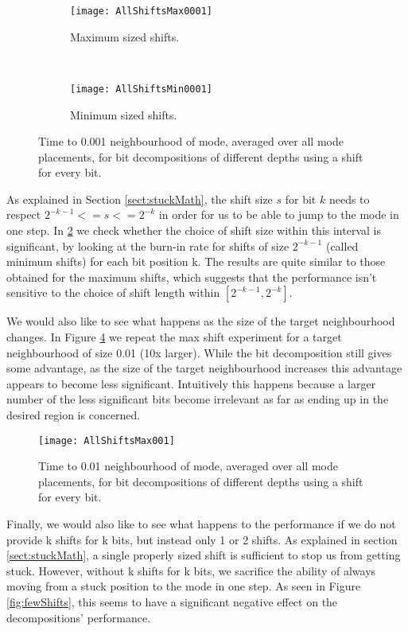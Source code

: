 \begin{figure}[h]
    \centering
    \begin{subfigure}[t]{0.48\textwidth}
      \texttt{[image: AllShiftsMax0001]}
      \caption{Maximum sized shifts.}
      \label{fig:allMaxShifts}
    \end{subfigure}
    ~
    \begin{subfigure}[t]{0.48\textwidth}
      \texttt{[image: AllShiftsMin0001]}
      \caption{Minimum sized shifts.}
      \label{fig:allMinShifts}
    \end{subfigure}
    \caption{Time to 0.001 neighbourhood of mode, averaged over all mode placements, for bit decompositions of different depths using a shift for every bit.}
    \label{fig:allShifts}
\end{figure}


As explained in Section \ref{sect:stuckMath}, the shift size $s$ for bit $k$ needs to respect $2^{-k-1} <= s <= 2^{-k}$ in order for us to be able to jump to the mode in one step. In \ref{fig:allMinShifts} we check whether the choice of shift size within this interval is significant, by looking at the burn-in rate for shifts of size $2^{-k-1}$ (called minimum shifts) for each bit position k. The results are quite similar to those obtained for the maximum shifts, which suggests that the performance isn't sensitive to the choice of shift length within $[2^{-k-1}, 2^{-k}]$.

We would also like to see what happens as the size of the target neighbourhood changes. In Figure \ref{fig:AllShiftsMax001} we repeat the max shift experiment for a target neighbourhood of size 0.01 (10x larger). While the bit decomposition still gives some advantage, as the size of the target neighbourhood increases this advantage appears to become less significant. Intuitively this happens because a larger number of the less significant bits become irrelevant as far as ending up in the desired region is concerned.

\begin{figure}[h]
    \centering
    \texttt{[image: AllShiftsMax001]}
    \caption{Time to 0.01 neighbourhood of mode, averaged over all mode placements, for bit decompositions of different depths using a shift for every bit.}
    \label{fig:AllShiftsMax001}
\end{figure}

Finally, we would also like to see what happens to the performance if we do not provide k shifts for k bits, but instead only 1 or 2 shifts. As explained in section \ref{sect:stuckMath}, a single properly sized shift is sufficient to stop us from getting stuck. However, without k shifts for k bits, we sacrifice the ability of always moving from a stuck position to the mode in one step. As seen in Figure \ref{fig:fewShifts}, this seems to have a significant negative effect on the decompositions' performance. 

